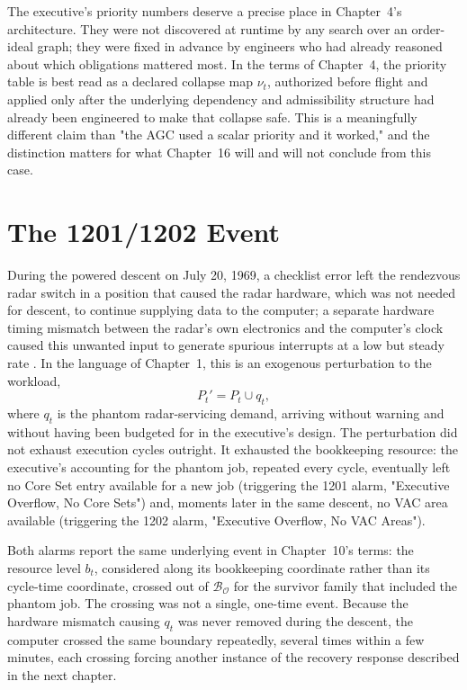 \documentclass[11pt]{report}
\begin{document}
The executive's priority numbers deserve a precise place in Chapter~4's architecture. They were not discovered at runtime by any search over an order-ideal graph; they were fixed in advance by engineers who had already reasoned about which obligations mattered most. In the terms of Chapter~4, the priority table is best read as a declared collapse map $\nu_t$, authorized before flight and applied only after the underlying dependency and admissibility structure had already been engineered to make that collapse safe. This is a meaningfully different claim than "the AGC used a scalar priority and it worked," and the distinction matters for what Chapter~16 will and will not conclude from this case.

\chapter{The 1201/1202 Event}

During the powered descent on July 20, 1969, a checklist error left the rendezvous radar switch in a position that caused the radar hardware, which was not needed for descent, to continue supplying data to the computer; a separate hardware timing mismatch between the radar's own electronics and the computer's clock caused this unwanted input to generate spurious interrupts at a low but steady rate \cite{nasaapollo11mission,nasaexperience1972}. In the language of Chapter~1, this is an exogenous perturbation to the workload,
\[
P_t' = P_t \cup q_t,
\]
where $q_t$ is the phantom radar-servicing demand, arriving without warning and without having been budgeted for in the executive's design. The perturbation did not exhaust execution cycles outright. It exhausted the bookkeeping resource: the executive's accounting for the phantom job, repeated every cycle, eventually left no Core Set entry available for a new job (triggering the 1201 alarm, "Executive Overflow, No Core Sets") and, moments later in the same descent, no VAC area available (triggering the 1202 alarm, "Executive Overflow, No VAC Areas").

Both alarms report the same underlying event in Chapter~10's terms: the resource level $b_t$, considered along its bookkeeping coordinate rather than its cycle-time coordinate, crossed out of $\mathcal B_{\mathcal O}$ for the survivor family that included the phantom job. The crossing was not a single, one-time event. Because the hardware mismatch causing $q_t$ was never removed during the descent, the computer crossed the same boundary repeatedly, several times within a few minutes, each crossing forcing another instance of the recovery response described in the next chapter.
\end{document}

